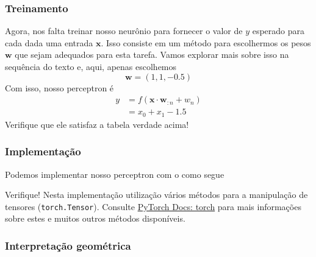     
\subsubsection{Treinamento}

Agora, nos falta treinar nosso neurônio para fornecer o valor de $y$ esperado para cada dada uma entrada $\pmb{x}$. Isso consiste em um método para escolhermos os pesos $\pmb{w}$ que sejam adequados para esta tarefa. Vamos explorar mais sobre isso na sequência do texto e, aqui, apenas escolhemos
\begin{equation}
  \pmb{w} = (1, 1, -0.5)
\end{equation}
Com isso, nosso perceptron é
\begin{align}
  y &= f(\pmb{x}\cdot\pmb{w}_{:n} + w_n)\\
    &= x_0 + x_1 - 1.5
\end{align}
Verifique que ele satisfaz a tabela verdade acima!

\subsubsection{Implementação}

\ifispython
Podemos implementar nosso perceptron com o {\pytorch} como segue



Verifique! Nesta implementação utilização vários métodos para a manipulação de tensores (\lstinline+torch.Tensor+). Consulte \href{https://pytorch.org/docs/stable/torch.html}{PyTorch Docs: torch} para mais informações sobre estes e muitos outros métodos disponíveis.
\fi

\subsubsection{Interpretação geométrica}

